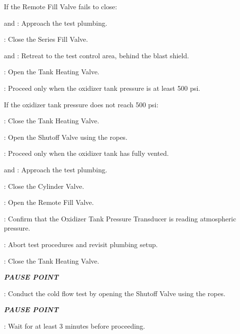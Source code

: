 \begin{checklist}
\begin{checklist}[label=$\bullet$]
        \item If the Remote Fill Valve fails to close:
        \begin{checklist}
            \item \primary{} and \secondary: Approach the test plumbing.
            \item \primary{}: Close the Series Fill Valve.
            \item \primary{} and \secondary: Retreat to the test control area, behind the blast shield.
        \end{checklist}
    \end{checklist}
    \item \heat: Open the Tank Heating Valve.
    \item \daq{}: Proceed only when the oxidizer tank pressure is at least 500 psi.
    \begin{checklist}[label=$\bullet$]
        \item If the oxidizer tank pressure does not reach 500 psi:
        \begin{checklist}
            \item \heat: Close the Tank Heating Valve.
            \item \primary{}: Open the Shutoff Valve using the ropes.
            \item \secondary: Proceed only when the oxidizer tank has fully vented.
            \item \primary{} and \secondary: Approach the test plumbing.
            \item \primary{}: Close the Cylinder Valve.
            \item \primary{}: Open the Remote Fill Valve.
            \item \daq{}: Confirm that the Oxidizer Tank Pressure Transducer is reading atmospheric pressure.
            \item \ops{}: Abort test procedures and revisit plumbing setup.
        \end{checklist}
    \end{checklist}
    \item \heat: Close the Tank Heating Valve.
    \item \textbf{\textit{PAUSE POINT}}
    \item \primary{}: Conduct the cold flow test by opening the Shutoff Valve using the ropes.
    \item \textbf{\textit{PAUSE POINT}}
    \item \ops{}: Wait for at least 3 minutes before proceeding.

\end{checklist}
